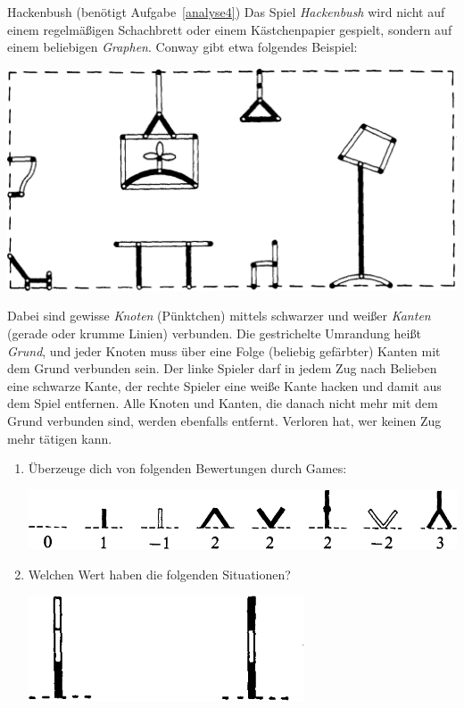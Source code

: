 \documentclass{zirkelblatt}
\begin{document}
\begin{aufgabe}{Hackenbush (benötigt Aufgabe~\ref{analyse4})}
\label{game-hackenbush}
Das Spiel \emph{Hackenbush} wird nicht auf einem regelmäßigen Schachbrett oder
einem Käst\-chen\-pa\-pier gespielt, sondern auf einem beliebigen \emph{Graphen}.
Conway gibt etwa folgendes Beispiel:
\begin{center}
\includegraphics[scale=0.2]{hackenbush}
\end{center}
Dabei sind gewisse \emph{Knoten} (Pünktchen) mittels schwarzer und weißer
\emph{Kanten} (gerade oder krumme Linien) verbunden. Die gestrichelte Umrandung
heißt \emph{Grund}, und jeder Knoten muss über eine Folge (beliebig gefärbter)
Kanten mit dem Grund verbunden sein. Der linke Spieler darf in
jedem Zug nach Belieben eine schwarze Kante, der rechte Spieler eine weiße
Kante hacken und damit aus dem Spiel entfernen. Alle Knoten und Kanten, die
danach nicht mehr mit dem Grund verbunden sind, werden ebenfalls entfernt.
Verloren hat, wer keinen Zug mehr tätigen kann.
\begin{enumerate}
\item Überzeuge dich von folgenden Bewertungen durch Games:
\begin{center}
\includegraphics[scale=0.4]{hackenbush-beispiele-1}
\end{center}
\item Welchen Wert haben die folgenden Situationen?
\begin{center}
\includegraphics[scale=0.6]{hackenbush-beispiele-2}

\end{center}
\end{enumerate}
\end{aufgabe}
\end{document}
